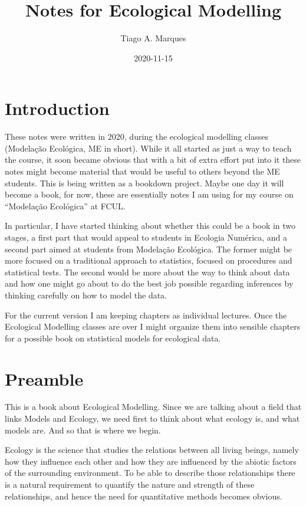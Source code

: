 \documentclass[
]{book}
\title{Notes for Ecological Modelling}
\author{Tiago A. Marques}
\date{2020-11-15}
\begin{document}
\maketitle

{
\setcounter{tocdepth}{1}
\tableofcontents
}
\hypertarget{introduction}{%
\chapter{Introduction}\label{introduction}}

These notes were written in 2020, during the ecological modelling classes (Modelação Ecológica, ME in short). While it all started as just a way to teach the course, it soon became obvious that with a bit of extra effort put into it these notes might become material that would be useful to others beyond the ME students. This is being written as a bookdown project. Maybe one day it will become a book, for now, these are essentially notes I am using for my course on ``Modelação Ecológica'' at FCUL.

In particular, I have started thinking about whether this could be a book in two stages, a first part that would appeal to students in Ecologia Numérica, and a second part aimed at students from Modelação Ecológica. The former might be more focused on a traditional approach to statistics, focused on procedures and statistical tests. The second would be more about the way to think about data and how one might go about to do the best job possible regarding inferences by thinking carefully on how to model the data.

For the current version I am keeping chapters as individual lectures. Once the Ecological Modelling classes are over I might organize them into sensible chapters for a possible book on statistical models for ecological data.

\hypertarget{mainintro}{%
\chapter{Preamble}\label{mainintro}}

This is a book about Ecological Modelling. Since we are talking about a field that links Models and Ecology, we need first to think about what ecology is, and what models are. And so that is where we begin.

Ecology is the science that studies the relations between all living beings, namely how they influence each other and how they are influenced by the abiotic factors of the surrounding environment. To be able to describe those relationships there is a natural requirement to quantify the nature and strength of these relationships, and hence the need for quantitative methods becomes obvious.
\end{document}
